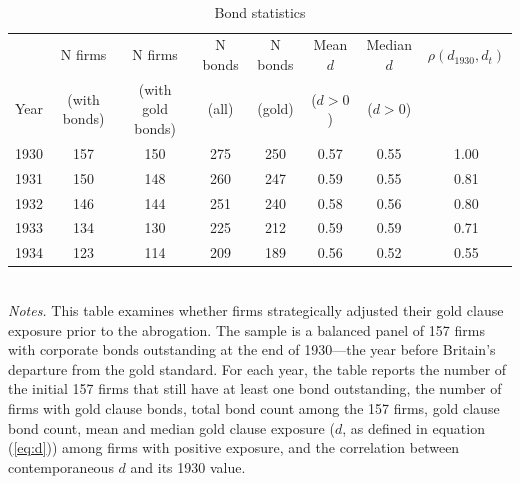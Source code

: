 \begin{table}[p]
    \centering
    \caption{\\ Bond statistics}
    \scriptsize
    \label{tab:bond_stats}
    
    \begin{threeparttable}
        \begin{tabular}{lccccccc}
            \toprule
                 & N firms & N firms & N bonds & N bonds & Mean $d$ & Median $d$ & $\rho(d_{1930}, d_t)$ \\
            Year & (with bonds) & (with gold bonds) & (all) & (gold) & ($d>0$) & ($d>0$) & \\
            \midrule
            1930 & 157     & 150 & 275 & 250 & 0.57 & 0.55 & 1.00 \\
            1931 & 150     & 148 & 260 & 247 & 0.59 & 0.55 & 0.81 \\
            1932 & 146     & 144 & 251 & 240 & 0.58 & 0.56 & 0.80 \\
            1933 & 134     & 130 & 225 & 212 & 0.59 & 0.59 & 0.71 \\
            1934 & 123     & 114 & 209 & 189 & 0.56 & 0.52 & 0.55 \\
            \bottomrule
        \end{tabular}
    \end{threeparttable}\\
    
    \vspace*{3mm} \justifying \noindent
    \scriptsize{\textit{Notes.} This table examines whether firms strategically adjusted their gold clause exposure prior to the abrogation. The sample is a balanced panel of 157 firms with corporate bonds outstanding at the end of 1930---the year before Britain's departure from the gold standard. For each year, the table reports the number of the initial 157 firms that still have at least one bond outstanding, the number of firms with gold clause bonds, total bond count among the 157 firms, gold clause bond count, mean and median gold clause exposure ($d$, as defined in equation (\ref{eq:d})) among firms with positive exposure, and the correlation between contemporaneous $d$ and its 1930 value.}
\end{table}